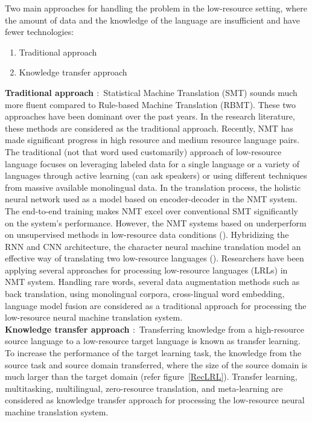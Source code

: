 \documentclass[manuscript,screen]{acmart}
\begin{document}
Two main approaches for handling the problem in the low-resource setting, where the amount of data and the knowledge of the language are insufficient and have fewer technologies: 
\begin{enumerate}
    \item Traditional approach
    \item Knowledge transfer approach
\end{enumerate}
\textbf{Traditional approach $\colon$}
Statistical Machine Translation (SMT) sounds much more fluent compared to Rule-based Machine Translation (RBMT). These two approaches have been dominant over the past years. In the research literature, these methods are considered as the traditional approach. Recently, NMT has made significant progress in high resource and medium resource language pairs.    
The traditional (not that word used customarily) approach of low-resource language focuses on leveraging labeled data for a single language or a variety of languages through active learning (can ask speakers) or using different techniques from massive available monolingual data. In the translation process, the holistic neural network used as a model based on encoder-decoder in the NMT system. The end-to-end training makes NMT excel over conventional SMT significantly on the system's performance. However, the NMT systems based on \citet{sutskever2014sequence, DBLP:journals/corr/BahdanauCB14,luong2015effective,vaswani2017attention} underperform on unsupervised methods in low-resource data conditions (\citet{sennrich2019revisiting}). Hybridizing the RNN and CNN  architecture, the character neural machine translation model an effective way of translating two low-resource languages (\citet{almansor2018hybrid}). Researchers have been applying several approaches for processing low-resource languages (LRLs) in NMT system. Handling rare words, several data augmentation methods such as back translation, using monolingual corpora, cross-lingual word embedding, language model fusion are considered as a traditional approach for processing the low-resource neural machine translation system.\\
\textbf{Knowledge transfer approach $\colon$}
Transferring knowledge from a high-resource source language to a low-resource target language is known as transfer learning. To increase the performance of the target learning task, the knowledge from the source task and source domain transferred, where the size of the source domain is much larger than the target domain (refer figure~\ref{RecLRL}). Transfer learning, multitasking, multilingual, zero-resource translation, and meta-learning are considered as knowledge transfer approach for processing the low-resource neural machine translation system. 
\end{document}
